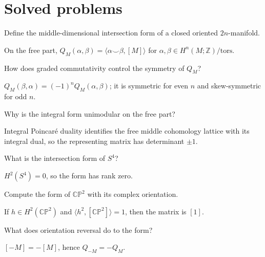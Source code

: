 \section{Solved problems}
\begin{problem}
Define the middle-dimensional intersection form of a closed oriented $2n$-manifold.
\end{problem}
\begin{solution}
On the free part, $Q_M(\alpha,\beta)=\langle \alpha\smile\beta,[M]\rangle$ for $\alpha,\beta\in H^n(M;\mathbb Z)/\mathrm{tors}$.
\end{solution}

\begin{problem}
How does graded commutativity control the symmetry of $Q_M$?
\end{problem}
\begin{solution}
$Q_M(\beta,\alpha)=(-1)^nQ_M(\alpha,\beta)$; it is symmetric for even $n$ and skew-symmetric for odd $n$.
\end{solution}

\begin{problem}
Why is the integral form unimodular on the free part?
\end{problem}
\begin{solution}
Integral Poincaré duality identifies the free middle cohomology lattice with its integral dual, so the representing matrix has determinant $\pm1$.
\end{solution}

\begin{problem}
What is the intersection form of $S^4$?
\end{problem}
\begin{solution}
$H^2(S^4)=0$, so the form has rank zero.
\end{solution}

\begin{problem}
Compute the form of $\mathbb{CP}^2$ with its complex orientation.
\end{problem}
\begin{solution}
If $h\in H^2(\mathbb{CP}^2)$ and $\langle h^2,[\mathbb{CP}^2]\rangle=1$, then the matrix is $[1]$.
\end{solution}

\begin{problem}
What does orientation reversal do to the form?
\end{problem}
\begin{solution}
$[-M]=-[M]$, hence $Q_{-M}=-Q_M$.
\end{solution}

